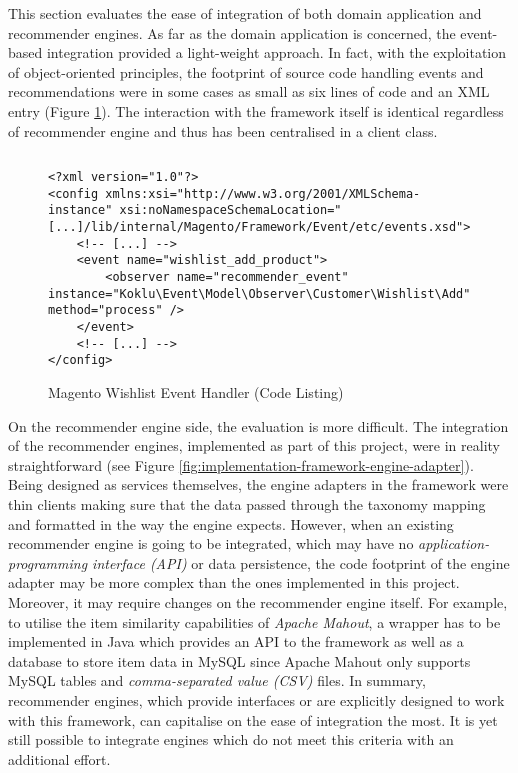 This section evaluates the ease of integration of both domain application and recommender engines. As far as the domain application is concerned, the event-based integration provided a light-weight approach. In fact, with the exploitation of object-oriented principles, the footprint of source code handling events and recommendations were in some cases as small as six lines of code and an XML entry (Figure \ref{fig:evaluation-framework-easy-magento}). The interaction with the framework itself is identical regardless of recommender engine and thus has been centralised in a client class.

\begin{figure}[ht]
    \inputminted{php}{./includes/source/demo/app/code/Koklu/Event/Model/Observer/Customer/Wishlist/Add.php}
    \begin{verbatim}
<?xml version="1.0"?>
<config xmlns:xsi="http://www.w3.org/2001/XMLSchema-instance" xsi:noNamespaceSchemaLocation="[...]/lib/internal/Magento/Framework/Event/etc/events.xsd">
    <!-- [...] -->
    <event name="wishlist_add_product">
        <observer name="recommender_event" instance="Koklu\Event\Model\Observer\Customer\Wishlist\Add" method="process" />
    </event>
    <!-- [...] -->
</config>

    \end{verbatim}
    \caption{Magento Wishlist Event Handler (Code Listing)}
    \label{fig:evaluation-framework-easy-magento}
\end{figure}

On the recommender engine side, the evaluation is more difficult. The integration of the recommender engines, implemented as part of this project, were in reality straightforward (see Figure \ref{fig:implementation-framework-engine-adapter}). Being designed as services themselves, the engine adapters in the framework were thin clients making sure that the data passed through the taxonomy mapping and formatted in the way the engine expects. However, when an existing recommender engine is going to be integrated, which may have no \emph{application-programming interface (API)} or data persistence, the code footprint of the engine adapter may be more complex than the ones implemented in this project. Moreover, it may require changes on the recommender engine itself. For example, to utilise the item similarity capabilities of \emph{Apache Mahout}, a wrapper has to be implemented in Java which provides an API to the framework as well as a database to store item data in MySQL since Apache Mahout only supports MySQL tables and \emph{comma-separated value (CSV)} files. In summary, recommender engines, which provide interfaces or are explicitly designed to work with this framework, can capitalise on the ease of integration the most. It is yet still possible to integrate engines which do not meet this criteria with an additional effort.

